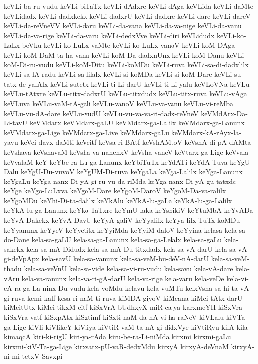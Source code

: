 {keVLi-ba-ru-vudu
keVLi-biTaTx
keVLi-dAdxre
keVLi-dAga
keVLida
keVLi-daMte
keVLidadx
keVLi-dadxkekx
keVLi-dadxrU
keVLi-dadxre
keVLi-dare
keVLi-dareV
keVLi-da-reVneVV
keVLi-daru
keVLi-da-vana
keVLi-da-va-nige
keVLi-da-vanu
keVLi-da-va-rige
keVLi-da-varu
keVLi-dedxVve
keVLi-diri
keVLidudx
keVLi-ko-LaLx-beVku
keVLi-ko-LuLx-vaMte
keVLi-ko-LuLx-vanoV
keVLi-koM-DAga
keVLi-koM-DaM-ta-ha-vanu
keVLi-koM-Da-dadxnUnx
keVLi-koM-Danu
keVLi-koM-Di-ru-vudu
keVLi-koM-Ditu
keVLi-koMDu
keVLi-ruva
keVLi-sa-di-dadxlilx
keVLi-sa-lA-radu
keVLi-sa-lilalx
keVLi-si-koMDa
keVLi-si-koM-Dare
keVLi-su-tatx-de-yalAlx
keVLi-sutetx
keVLi-ti-Li-darU
keVLi-ti-Li-yalu
keVLoVNa
keVLu
keVLu-tAtxre
keVLu-titx-dadxrU
keVLu-titxdudx
keVLu-titx-ruva
keVLu-vAga
keVLuva
keVLu-vaM-tA-gali
keVLu-vanoV
keVLu-va-vanu
keVLu-vi-reMba
keVLu-vu-dA-dare
keVLu-vudU
keVLu-vu-va-va-ri-dadx-reVneV
keVMdArx-Da-Li-tavU
keVMdarx
keVMdarx-gaLU
keVMdarx-ga-Lalilx
keVMdarx-ga-Lanunx
keVMdarx-ga-Lige
keVMdarx-ga-Live
keVMdarx-gaLu
keVMdarx-kA-rAyx-la-yavu
keVci-davx-daMti
keVcitf
keVsa-ri-BAtf
keVshAMtoV
keVshA-di-pA-dAMta
keVshava
keVshavaM
keVsha-va-nanenxV
keVsha-vaneV
keVtarx-ga-Lige
keVvala
keVvalaM
keY
keYbe-ra-Lu-ga-Lanunx
keYbiTuTx
keYdATi
keYdA-Tuva
keYgU-Dalu
keYgU-Du-vuvoV
keYgUM-Di-ruva
keYgaLa
keYga-Lalilx
keYga-Lanunx
keYgaLu
keYga-nanx-Di-yA-gi-ru-vu-da-riMda
keYga-nanx-Di-yA-gu-tatxde
keYge
keYgo-LuLxva
keYgoM-Dare
keYgoM-DaroV
keYgoM-Da-va-ralilx
keYgoMDu
keYhi-Di-ta-dalilx
keYkAlu
keYkA-lu-gaLa
keYkA-lu-ga-Lalilx
keYkA-lu-ga-Lanunx
keYko-TaTxre
keYmU-laka
keYshikiV
keYtuMbA
keYvADa
keYvA-Dakekx
keYvA-DavU
keYyA-galiV
keYyalilx
keYya-lilx-TuTx-koMDu
keYyanunx
keYyeV
keYyetitx
keYyiMda
keYyiM-daloV
keYyina
kelasa
kela-sa-do-Dane
kela-sa-gaLU
kela-sa-ga-Lanunx
kela-sa-ga-Lelalx
kela-sa-gaLu
kela-sakekx
kela-sa-mA-Didudx
kela-sa-mA-Du-titxdadx
kela-sa-vA-darU
kela-sa-vA-gi-deVpApx
kela-savU
kela-sa-vanunx
kela-sa-veM-bu-deV-nA-darU
kela-sa-veM-thadu
kela-sa-veVnU
kela-sa-vide
kela-sa-vi-ru-vudu
kela-savu
kela-vA-dare
kela-vAru
kela-va-ranunx
kela-va-ri-gA-darU
kela-va-rige
kela-varu
kela-veDe
kela-vi-cA-ra-ga-La-ninx-Du-vudu
kela-voMdu
kelavu
kela-vuMTu
kelxVsha-sa-hi-ta-vA-gi-ruva
kemi-kalf
kesa-ri-naM-ti-ruva
kiMDA-giyoV
kiMcana
kiMci-tAtx-darU
kiMcitUtx
kiMci-tikxM-citf
kiSxVrA-bUdhxyX-miR-ca-ya-karxmeYH
kiSxVra
kiSxVra-vatf
kiSxpAtx
kiSxtimf
kiSxti-naM-da-nA-vi-ha-raNeV
kiVLalu
kiVTa-ga-Lige
kiVli
kiVlikeY
kiVliya
kiVtiR-vaM-ta-nA-gi-didxVye
kiVtiRyu
kilA
kila
kimaqcA
kiri-ki-rigU
kiri-ya-rAda
kiru-be-ra-Li-niMda
kirxmi
kirxmi-gaLu
kirxmi-kiV-Ta-ga-Lige
kirxsatx-pU-vaR-dedxMdu
kirxyA
kirxyA-deVnaM
kirxyA-ni-mi-tetxV-Savxpi
}
